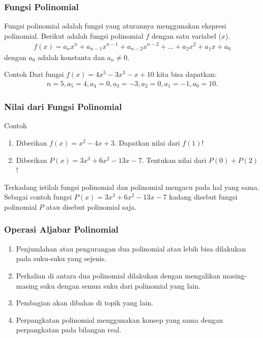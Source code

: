 \documentclass[11pt]{beamer}
\begin{document}
	\begin{frame}
		\frametitle{Fungsi Polinomial}
		Fungsi polinomial adalah fungsi yang aturannya menggunakan ekspresi polinomial. Berikut adalah fungsi polinomial $f$ dengan satu variabel ($x$).
		\begin{align*}
			f(x)=a_nx^n+a_{n-1}x^{n-1}+a_{n-2}x^{n-2}+...+a_2x^2+a_1x+a_0
		\end{align*}
		dengan $a_0$ adalah konstanta dan $a_n\neq0$.
		
		\begin{exampleblock}{Contoh}
			Dari fungsi $f(x)=4x^5-3x^3-x+10$ kita bisa dapatkan:
			\begin{align*}
				n=5, a_5=4, a_4=0, a_3=-3, a_2=0, a_1=-1, a_0=10.
			\end{align*}
		\end{exampleblock}
		
	\end{frame}
	
	\begin{frame}
		\frametitle{Nilai dari Fungsi Polinomial}
		
		\begin{exampleblock}{Contoh}
			\begin{enumerate}
				\item Diberikan $f(x)=x^2-4x+3$. Dapatkan nilai dari $f(1)$!
				\item Diberikan $P(x)=3x^3+6x^2-13x-7$. Tentukan nilai dari $P(0)+P(2)$!
			\end{enumerate}
		\end{exampleblock}
		Terkadang istilah fungsi polinomial dan polinomial mengacu pada hal yang sama. Sebagai contoh fungsi $P(x)=3x^3+6x^2-13x-7$ kadang disebut fungsi polinomial $P$ atau disebut polinomial saja.
	\end{frame}
	
	\begin{frame}
		\frametitle{Operasi Aljabar Polinomial}
		\begin{enumerate}
			\item Penjumlahan atau pengurangan dua polinomial atau lebih bisa dilakukan pada suku-suku yang sejenis.
			\item Perkalian di antara dua polinomial dilakukan dengan mengalikan masing-masing suku dengan semua suku dari polinomial yang lain.
			\item Pembagian akan dibahas di topik yang lain.
			\item Perpangkatan polinomial menggunakan konsep yang sama dengan perpangkatan pada bilangan real.
		\end{enumerate}
	\end{frame}
	
\end{document}
